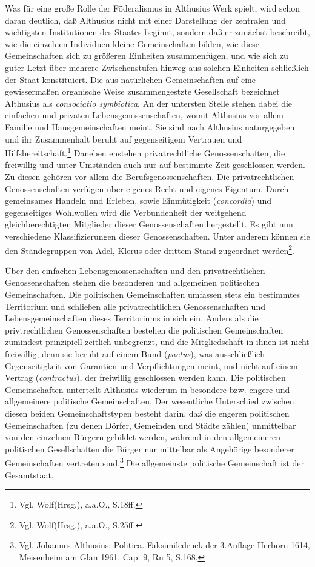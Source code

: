 \documentclass[a4paper,12pt]{article}
\begin{document}
Was für eine große Rolle der Föderalismus in Althusius Werk spielt,
wird schon daran deutlich, daß Althusius nicht mit einer Darstellung
der zentralen und wichtigsten Institutionen des Staates beginnt,
sondern daß er zunächst beschreibt, wie die einzelnen Individuen
kleine Gemeinschaften bilden, wie diese Gemeinschaften sich zu
größeren Einheiten zusammenfügen, und wie sich zu guter Letzt über
mehrere Zwischenstufen hinweg aus solchen Einheiten schließlich der
Staat konstituiert. Die aus natürlichen Gemeinschaften auf eine
gewissermaßen organische Weise zusammengestzte Gesellschaft bezeichnet
Althusius als {\em consociatio symbiotica}. An der untersten Stelle
stehen dabei die einfachen und privaten Lebensgenossenschaften, womit
Althusius vor allem Familie und Hausgemeinschaften meint. Sie sind
nach Althusius naturgegeben und ihr Zusammenhalt beruht auf
gegenseitigem Vertrauen und
Hilfsbereitschaft.\footnote{Vgl. Wolf(Hrsg.)\cite{wolf}, a.a.O.,
S.18ff.} Daneben enstehen privatrechtliche Genossenschaften, die
freiwillig und unter Umständen auch nur auf bestimmte Zeit geschlossen
werden. Zu diesen gehören vor allem die Berufsgenossenschaften. Die
privatrechtlichen Genossenschaften verfügen über eigenes Recht und
eigenes Eigentum. Durch gemeinsames Handeln und Erleben, sowie
Einmütigkeit ({\em concordia}) und gegenseitiges Wohlwollen wird die
Verbundenheit der weitgehend gleichberechtigten Mitglieder dieser
Genossenschaften hergestellt. Es gibt nun verschiedene
Klassifizierungen dieser Genossenschaften. Unter anderem können sie
den Ständegruppen von Adel, Klerus oder drittem Stand zugeordnet
werden\footnote{Vgl.  Wolf(Hrsg.)\cite{wolf}, a.a.O., S.25ff.}.

Über den einfachen Lebensgenossenschaften und den privatrechtlichen
Genossenschaften stehen die besonderen und allgemeinen politischen
Gemeinschaften. Die politischen Gemeinschaften umfassen stets
ein bestimmtes Territorium und schließen alle privatrechtlichen
Genossenschaften und Lebensgemeinschaften dieses Territoriums in
sich ein. Anders als die privtrechtlichen Genossenschaften bestehen
die politischen Gemeinschaften zumindest prinzipiell zeitlich
unbegrenzt, und die Mitgliedschaft in ihnen ist nicht freiwillig,
denn sie beruht auf einem Bund ({\em pactus}), was ausschließlich
Gegenseitigkeit von Garantien und Verpflichtungen meint, und nicht
auf einem Vertrag ({\em contractus}), der freiwillig geschlossen
werden kann. Die politischen Gemeinschaften unterteilt Althusius
wiederum in besondere bzw. engere und allgemeinere politische
Gemeinschaften. Der wesentliche Unterschied zwischen diesen beiden
Gemeinschaftstypen besteht darin, daß die engeren politischen
Gemeinschaften (zu denen Dörfer, Gemeinden und Städte zählen)
unmittelbar von den einzelnen Bürgern gebildet werden, während in
den allgemeineren politischen Gesellschaften die Bürger nur
mittelbar als Angehörige besonderer Gemeinschaften vertreten
sind.\footnote{Vgl. Johannes Althusius\cite{althusius}:
Politica. Faksimiledruck der 3.Auflage Herborn 1614, Meisenheim am
Glan 1961, Cap. 9, Rn 5, S.168.}  Die allgemeinste politische
Gemeinschaft ist der Gesamtstaat.
\end{document}
